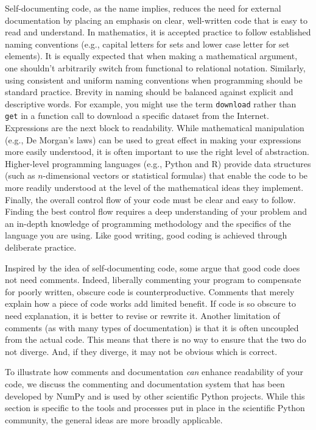 \documentclass[11pt,oneside,english]{article}
\begin{document}
Self-documenting code, as the name implies, reduces the need for external
documentation by placing an emphasis on clear, well-written code that is easy
to read and understand.  In mathematics, it is accepted practice to follow
established naming conventions (e.g., capital letters for sets and lower case
letter for set elements). It is equally expected that when making a
mathematical argument, one shouldn't arbitrarily switch from functional to
relational notation.  Similarly, using consistent and uniform naming
conventions when programming should be standard practice. Brevity in naming
should be balanced against explicit and descriptive words. For example, you
might use the term \texttt{download} rather than \texttt{get} in a function
call to download a specific dataset from the Internet. Expressions are the next
block to readability. While mathematical manipulation (e.g., De Morgan's laws)
can be used to great effect in making your expressions more easily understood,
it is often important to use the right level of abstraction. Higher-level
programming languages (e.g., Python and R) provide data structures (such as
$n$-dimensional vectors or statistical formulas) that enable the code to be
more readily understood at the level of the mathematical ideas they implement.
Finally, the overall control flow of your code must be clear and easy to
follow. Finding the best control flow requires a deep understanding of your
problem and an in-depth knowledge of programming methodology and the specifics
of the language you are using.  Like good writing, good coding is achieved
through deliberate practice.

Inspired by the idea of self-documenting code, some argue that good code does
not need comments. Indeed, liberally commenting your program to compensate for
poorly written, obscure code is counterproductive. Comments that merely explain
how a piece of code works add limited benefit. If code is so obscure to need
explanation, it is better to revise or rewrite it. Another limitation of
comments (as with many types of documentation) is that it is often uncoupled
from the actual code. This means that there is no way to ensure that the two do
not diverge.  And, if they diverge, it may not be obvious which is correct.

To illustrate how comments and documentation \emph{can} enhance readability of
your code, we discuss the commenting and documentation system that has been
developed by NumPy and is used by other scientific Python projects. While this
section is specific to the tools and processes put in place in the scientific
Python community, the general ideas are more broadly applicable.
\end{document}
